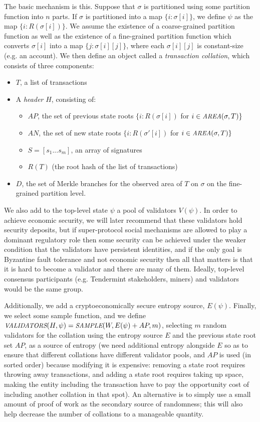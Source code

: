 \documentclass[11pt,a4paper]{article}
\makeatletter
\theoremstyle{plain}
\theoremstyle{definition}
\theoremstyle{remark}
\newcommand{\eg}{e.g.\@\xspace}
\newcommand{\makeintoafunction}[1]{\textit{\uppercase{\small #1}}}
\newcommand{\AREA}{\makeintoafunction{area}}
\newcommand{\VALIDATORS}{\makeintoafunction{validators}}
\newcommand{\SAMPLE}{\makeintoafunction{sample}}
\makeatother
\begin{document}
The basic mechanism is this. Suppose that $\sigma$ is partitioned using some partition function into $n$ parts. If $\sigma$ is partitioned into a map $\{i: \sigma[i]\}$, we define $\psi$ as the map $\{i: R(\sigma[i])\}$. We assume the existence of a coarse-grained partition function as well as the existence of a fine-grained partition function which converts $\sigma[i]$ into a map $\{j: \sigma[i][j]\}$, where each $\sigma[i][j]$ is constant-size (\eg an account). We then define an object called a \emph{transaction collation}, which consists of three components:

\begin{itemize}
\item
$T$, a list of transactions
\item
A \emph{header} $H$, consisting of:
    \begin{itemize}
    \item
    $AP$, the set of previous state roots $\{i: R(\sigma[i])$ for $i \in \AREA(\sigma, T)\}$
    \item
    $AN$, the set of new state roots $\{i: R(\sigma'[i])$ for $i \in \AREA(\sigma, T)\}$
    \item
    $S = [s_1 ... s_m]$, an array of signatures
    \item
    $R(T)$ (the root hash of the list of transactions)
    \end{itemize}
\item
$D$, the set of Merkle branches for the observed area of $T$ on $\sigma$ on the fine-grained partition level.
\end{itemize}

We also add to the top-level state $\psi$ a pool of validators $V(\psi)$. In order to achieve economic security, we will later recommend that these validators hold security deposits, but if super-protocol social mechanisms are allowed to play a dominant regulatory role then some security can be achieved under the weaker condition that the validators have persistent identities, and if the only goal is Byzantine fault tolerance and not economic security then all that matters is that it is hard to become a validator and there are many of them. Ideally, top-level consensus participants (\eg Tendermint stakeholders, miners) and validators would be the same group.

Additionally, we add a cryptoeconomically secure entropy source, $E(\psi)$. Finally, we select some sample function, and we define $\VALIDATORS(H, \psi) = \SAMPLE(W, E(\psi) + AP, m)$, selecting $m$ random validators for the collation using the entropy source $E$ and the previous state root set $AP$, as a source of entropy (we need additional entropy alongside $E$ so as to ensure that different collations have different validator pools, and $AP$ is used (in sorted order) because modifying it is expensive: removing a state root requires throwing away transactions, and adding a state root requires taking up space, making the entity including the transaction have to pay the opportunity cost of including another collation in that spot). An alternative is to simply use a small amount of proof of work as the secondary source of randomness; this will also help decrease the number of collations to a manageable quantity.
\end{document}
